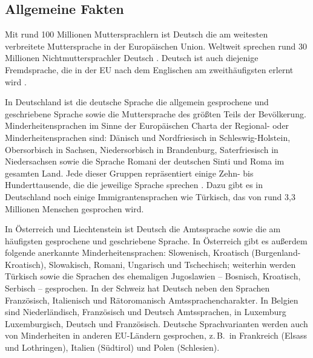 \begin{multicols}{2}

\subsection{Allgemeine Fakten}

Mit rund 100 Millionen Muttersprachlern ist Deutsch die am weitesten verbreitete Muttersprache in der Europäischen Union. Weltweit sprechen rund 30 Millionen Nichtmuttersprachler Deutsch \cite{Eur1}. Deutsch ist auch diejenige Fremdsprache, die in der EU nach dem Englischen am zweithäufigsten erlernt wird \cite{Goe1}.


In Deutschland ist die deutsche Sprache die allgemein gesprochene und geschriebene Sprache sowie die Muttersprache des größten Teils der Bevölkerung. Minderheitensprachen im Sinne der Europäischen Charta der Regional- oder Minderheitensprachen sind: Dänisch und Nordfriesisch in Schles\-wig-Hol\-stein, Obersorbisch in Sachsen, Niedersorbisch in Brandenburg, Saterfriesisch in Niedersachsen sowie die Sprache Romani der deutschen Sinti und Roma im gesamten Land. Jede dieser Gruppen repräsentiert einige Zehn- bis Hunderttausende, die die jeweilige Sprache sprechen \cite{Efni1}. Dazu gibt es in Deutschland noch einige Immigrantensprachen wie Türkisch, das von rund 3,3 Millionen Menschen gesprochen wird. 

In Österreich und Liechtenstein ist Deutsch die Amtssprache sowie die am häufigsten gesprochene und geschriebene Sprache. In Österreich gibt es außerdem folgende anerkannte Minderheitensprachen: Slowenisch, Kroatisch (Bur\-gen\-land-Kro\-atisch), Slowakisch, Romani, Ungarisch und Tschechisch; weiterhin werden Türkisch sowie die Sprachen des ehemaligen Jugoslawien -- Bosnisch, Kroatisch, Serbisch -- gesprochen.  In der Schweiz hat Deutsch neben den Sprachen Französisch, Italienisch und Rätoromanisch Amtssprachencharakter. In Belgien sind Niederländisch, Französisch und Deutsch Amtssprachen, in Luxemburg Luxemburgisch, Deutsch und Französisch. Deutsche Sprachvarianten werden auch von Minderheiten in anderen EU-Län\-dern gesprochen, z.\,B.~in Frankreich (Elsass und Lothringen), Italien (Südtirol) und Polen (Schlesien).  


\end{multicols}
